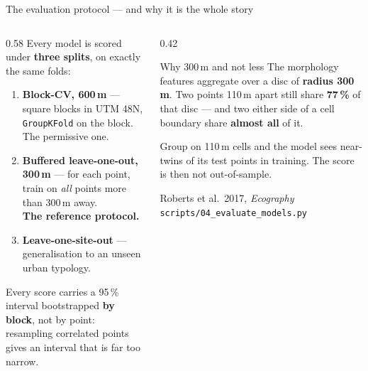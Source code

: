 \documentclass[aspectratio=169,10pt]{beamer}
\newcommand{\src}[1]{{\scriptsize\color{muted}\texttt{#1}}}
\newcommand{\aside}[1]{{\scriptsize\color{muted}#1}}
\newcommand{\up}[1]{\textcolor{good}{\textbf{#1}}}
\begin{document}
\begin{frame}{The evaluation protocol --- and why it is the whole story}
  \begin{columns}[T]
    \begin{column}{0.58\textwidth}
      Every model is scored under \textbf{three splits}, on exactly the same folds:
      \vspace{.4em}
      \begin{enumerate}
        \item \textbf{Block-CV, 600\,m} --- square blocks in UTM 48N,
              \texttt{GroupKFold} on the block. The permissive one.
        \item \textbf{Buffered leave-one-out, 300\,m} --- for each point, train on
              \emph{all} points more than 300\,m away.\\
              \up{The reference protocol.}
        \item \textbf{Leave-one-site-out} --- generalisation to an unseen urban
              typology.
      \end{enumerate}
      \vspace{.5em}
      Every score carries a 95\,\% interval bootstrapped \textbf{by block}, not by
      point: resampling correlated points gives an interval that is far too narrow.
    \end{column}
    \begin{column}{0.42\textwidth}
      \begin{alertblock}{Why 300\,m and not less}
        The morphology features aggregate over a disc of \textbf{radius
        300\,m}. Two points 110\,m apart still share \textbf{77\,\%} of that disc
        --- and two either side of a cell boundary share \textbf{almost all} of it.
        \vspace{.3em}

        Group on 110\,m cells and the model sees near-twins of its test points in
        training. The score is then not out-of-sample.
      \end{alertblock}
      \aside{Roberts et al.\ 2017, \emph{Ecography}}\\ \src{scripts/04\_evaluate\_models.py}
    \end{column}
  \end{columns}
\end{frame}
\end{document}
